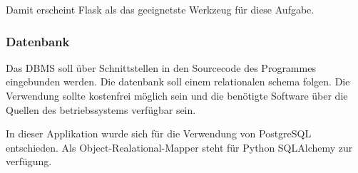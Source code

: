 Damit erscheint Flask als das geeignetste Werkzeug für diese Aufgabe.


\subsubsection{Datenbank}

Das DBMS soll über Schnittstellen in den Sourcecode des Programmes eingebunden werden. Die datenbank soll einem relationalen schema folgen. Die Verwendung sollte kostenfrei möglich sein und die benötigte Software über die Quellen des betriebssystems verfügbar sein. 

In dieser Applikation wurde sich für die Verwendung von PostgreSQL entschieden. Als Object-Realational-Mapper steht für Python SQLAlchemy zur verfügung.


